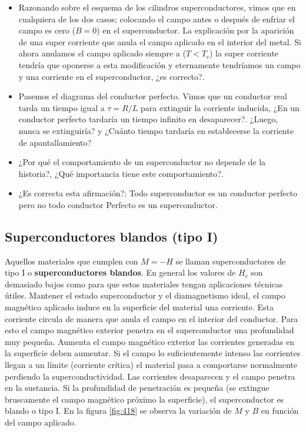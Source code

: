 \begin{itemize}
	\item Razonando sobre el esquema de los cilindros superconductores, vimos que en cualquiera de los dos casos; colocando el campo antes o después de enfriar el campo es cero ($B=0$) en el superconductor. La explicación por la aparición de una super corriente que anula el campo aplicado en el interior del metal. Si ahora anulamos el campo aplicado siempre a ($T<T_{c}$) la super corriente tendría que oponerse a esta modificación y eternamente tendríamos un campo y una corriente en el superconductor, ¿es correcto?.
	
	\item Pasemos el diagrama del conductor perfecto. Vimos que un conductor real tarda un tiempo igual a $\tau=R/L$ para extinguir la corriente inducida, ¿En un conductor perfecto tardaría un tiempo infinito en desaparecer?. ¿Luego, nunca se extinguiría? y ¿Cuánto tiempo tardaría en establecerse la corriente de apantallamiento?
	
	\item ¿Por qué el comportamiento de un superconductor no depende de la historia?, ¿Qué importancia tiene este comportamiento?.
	
	\item ¿Es correcta esta afirmación?: Todo superconductor es un conductor perfecto pero no todo conductor Perfecto es un superconductor.
	
\end{itemize}

\subsection{Superconductores blandos (tipo I)}

Aquellos materiales que cumplen con $M=-H$ se llaman superconductores de tipo I o \textbf{superconductores blandos}. En general los valores de $H_{c}$ son demasiado bajos como para que estos materiales tengan aplicaciones técnicas útiles. Mantener el estado superconductor y el diamagnetismo ideal, el campo magnético aplicado induce en la superficie del material una corriente. Esta corriente circula de manera que anula el campo en el interior del conductor. Para esto el campo magnético exterior penetra en el superconductor una profundidad muy pequeña. Aumenta el campo magnético exterior las corrientes generadas en la superficie deben aumentar. Si el campo lo suficientemente intenso las corrientes llegan a un límite (corriente crítica) el material pasa a comportarse normalmente perdiendo la superconductividad. Las corrientes desaparecen y el campo penetra en la sustancia. Si la profundidad de penetración es pequeña (se extingue bruscamente el campo magnético próximo la superficie), el superconductor es blando o tipo I. En la figura \ref{fig:418} se observa la variación de $M$ y $B$ en función del campo aplicado.

